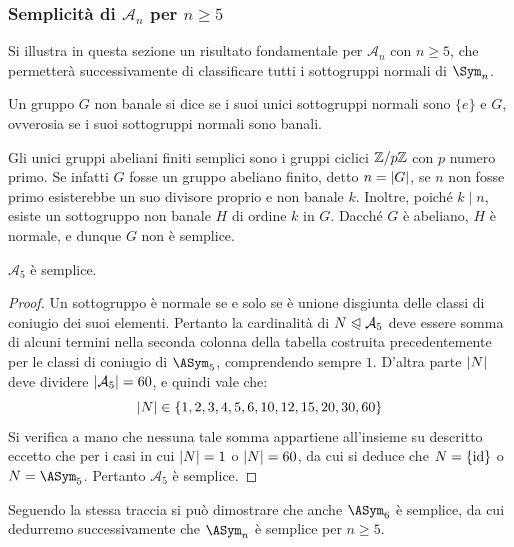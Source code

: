 \documentclass[11pt]{scrartcl}
\begin{document}
	\subsubsection{Semplicità di \texorpdfstring{$\mathcal{A}_n$}{Aₙ} per \texorpdfstring{$n \geq 5$}{n≥5}}
	
	Si illustra in questa sezione un risultato fondamentale per
	$\mathcal{A}_n$ con $n \geq 5$, che permetterà successivamente
	di classificare tutti i sottogruppi normali di $\Sym_n$.
	
	\begin{definition}
		Un gruppo $G$ non banale si dice  se i suoi unici sottogruppi
		normali sono $\{e\}$ e $G$, ovverosia se i suoi sottogruppi normali sono
		banali.
	\end{definition}
	
	\begin{remark}
		Gli unici gruppi abeliani finiti semplici sono i gruppi ciclici $\mathbb{Z}/{p}\mathbb{Z}$ con
		$p$ numero primo. Se infatti $G$ fosse un gruppo abeliano finito, detto
		$n = \left\lvert G \right\rvert$, se $n$ non fosse primo esisterebbe un suo divisore proprio e
		non banale $k$. Inoltre, poiché $k \mid n$, esiste un sottogruppo non banale $H$
		di ordine $k$ in $G$. Dacché $G$ è abeliano, $H$ è normale, e dunque $G$
		non è semplice.
	\end{remark}
	
	\begin{proposition}
		\label{prop1.61}
		$\mathcal{A}_5$ è semplice.
	\end{proposition}
	
	\begin{proof}
		Un sottogruppo è normale se e solo se è unione disgiunta
		delle classi di coniugio dei suoi elementi. Pertanto la cardinalità
		di $N \trianglelefteqslant \mathcal{A}_5$ deve essere somma di alcuni 
		termini nella seconda colonna della tabella costruita precedentemente
		per le classi di coniugio di $\ASym_5$,
		comprendendo sempre $1$. D'altra parte $\left\lvert N \right\rvert$ deve dividere
		$\left\lvert \mathcal{A}_5 \right\rvert = 60$, e quindi vale che:
		\[ \left\lvert N \right\rvert \in \{ 1, 2, 3, 4, 5, 6, 10, 12, 15, 20, 30, 60 \} \]
		Si verifica a mano che nessuna tale somma appartiene all'insieme su descritto
		eccetto che per i casi in cui $\left\lvert N \right\rvert = 1$ o $\left\lvert N \right\rvert = 60$, da cui
		si deduce che $N = \{\mathrm{id}\}$ o $N = \ASym_5$.
		Pertanto $\mathcal{A}_5$ è semplice.
	\end{proof}
	
	Seguendo la stessa traccia si può dimostrare che anche $\ASym_6$ è semplice, da cui
	dedurremo successivamente che $\ASym_n$ è semplice per $n \geq 5$.
\end{document}
